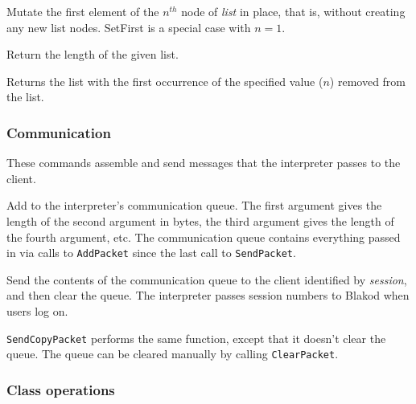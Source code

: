 Mutate the first element of the $n^{th}$ node of {\em list} in place, that is, without
creating any new list nodes.  SetFirst is a special case with $n = 1$.

\begin{leftlines}
\end{leftlines}

Return the length of the given list.

\begin{leftlines}
\end{leftlines}

Returns the list with the first occurrence of the specified value ($n$) 
removed from the list.


\subsubsection{Communication}

These commands assemble and send messages that the interpreter passes
to the client.

\begin{leftlines}
\end{leftlines}

Add to the interpreter's communication queue.  The first argument
gives the length of the second argument in bytes, the third argument
gives the length of the fourth argument, etc.  The communication queue
contains everything passed in via calls to {\tt AddPacket} since the
last call to {\tt SendPacket}.

\begin{leftlines}


\end{leftlines}

Send the contents of the communication queue to the client identified
by {\em session}, and then clear the queue.  The interpreter passes
session numbers to Blakod when users log on.

{\tt SendCopyPacket} performs the same function, except that it
doesn't clear the queue.  The queue can be cleared manually by calling
{\tt ClearPacket}.

\subsubsection{Class operations}

